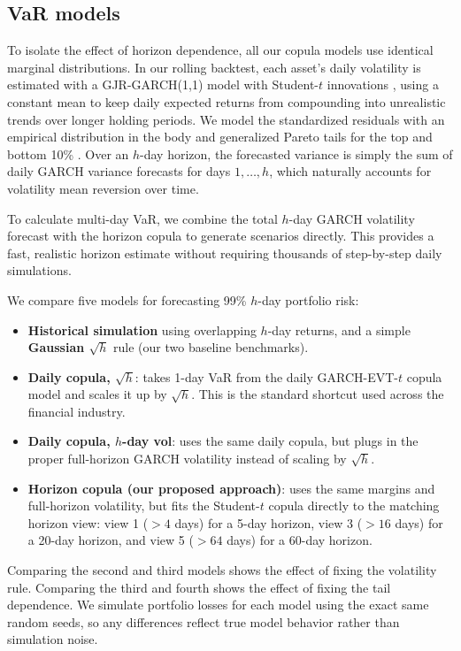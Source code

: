 \documentclass[11pt,a4paper]{article}
\begin{document}
\subsection{VaR models}
\label{sec:models}

To isolate the effect of horizon dependence, all our copula models use identical marginal distributions. In our rolling backtest, each asset's daily volatility is estimated with a GJR-GARCH(1,1) model with Student-$t$ innovations \cite{gjr1993}, using a constant mean to keep daily expected returns from compounding into unrealistic trends over longer holding periods. We model the standardized residuals with an empirical distribution in the body and generalized Pareto tails for the top and bottom 10\% \cite{mcneil2015}. Over an $h$-day horizon, the forecasted variance is simply the sum of daily GARCH variance forecasts for days $1,\dots,h$, which naturally accounts for volatility mean reversion over time.

To calculate multi-day VaR, we combine the total $h$-day GARCH volatility forecast with the horizon copula to generate scenarios directly. This provides a fast, realistic horizon estimate without requiring thousands of step-by-step daily simulations.

We compare five models for forecasting 99\% $h$-day portfolio risk:
\begin{itemize}[leftmargin=1.2em]
\item \textbf{Historical simulation} using overlapping $h$-day returns, and a simple \textbf{Gaussian $\sqrt{h}$} rule (our two baseline benchmarks).
\item \textbf{Daily copula, $\sqrt{h}$}: takes 1-day VaR from the daily GARCH-EVT-$t$ copula model and scales it up by $\sqrt{h}$. This is the standard shortcut used across the financial industry.
\item \textbf{Daily copula, $h$-day vol}: uses the same daily copula, but plugs in the proper full-horizon GARCH volatility instead of scaling by $\sqrt{h}$.
\item \textbf{Horizon copula (our proposed approach)}: uses the same margins and full-horizon volatility, but fits the Student-$t$ copula directly to the matching horizon view: view 1 ($>4$ days) for a 5-day horizon, view 3 ($>16$ days) for a 20-day horizon, and view 5 ($>64$ days) for a 60-day horizon.
\end{itemize}
Comparing the second and third models shows the effect of fixing the volatility rule. Comparing the third and fourth shows the effect of fixing the tail dependence. We simulate \Sims{} portfolio losses for each model using the exact same random seeds, so any differences reflect true model behavior rather than simulation noise.
\end{document}
